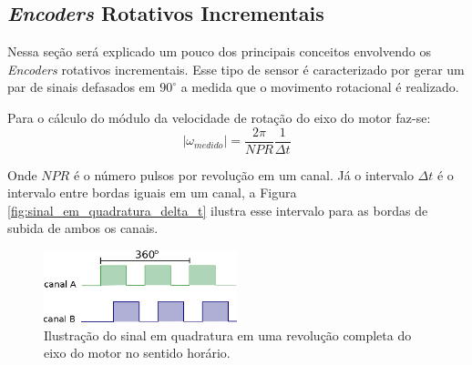 \subsection{\textit{Encoders} Rotativos Incrementais}

Nessa seção será explicado um pouco dos principais conceitos envolvendo os \emph{Encoders} rotativos incrementais. Esse tipo de sensor é caracterizado por gerar um par de sinais defasados em $90^\circ$ a medida que o movimento rotacional é realizado.


Para o cálculo do módulo da velocidade de rotação do eixo do motor faz-se:
\begin{equation}
    |\omega_{medido}| = \frac{2\pi}{NPR}\frac{1}{\Delta{t}}
    \label{eq:modulo_omega_medido}
\end{equation}

Onde $NPR$ é o número pulsos por revolução em um canal. Já o intervalo $\Delta{t}$ é o intervalo entre bordas iguais em um canal, a Figura \ref{fig:sinal_em_quadratura_delta_t} ilustra esse intervalo para as bordas de subida de ambos os canais.\\

\begin{figure}[H]
    \centering
    \includegraphics[width=0.5\textwidth]{imagens/ilustracoes/sinal_enquadratura_uma_revolucao.eps}
    \caption{Ilustração do sinal em quadratura em uma revolução completa do eixo do motor no sentido horário.}
    \label{fig:ilustracao_uma_revolucao}
\end{figure}

